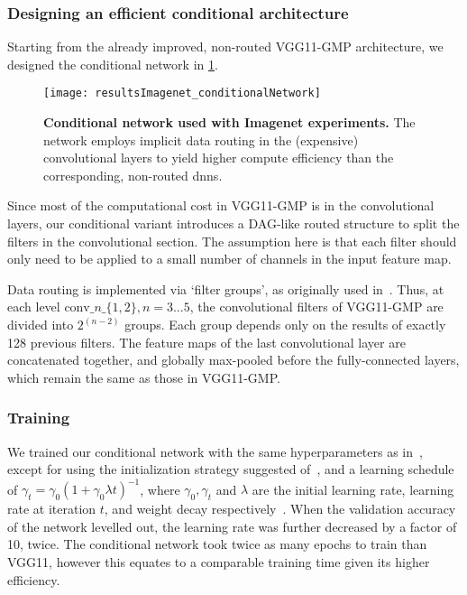\documentclass[thesis]{subfiles}
\begin{document}
	\subsubsection{Designing an efficient conditional architecture}
	Starting from the already improved, non-routed VGG11-GMP architecture, we designed the conditional network in \cref{fig:Imagenet_CondNet}.
	\begin{figure}[tbp]
		\centering
		\texttt{[image: resultsImagenet\_conditionalNetwork]}
		\caption[Conditional network used with Imagenet ILSVRC experiments.]{\textbf{Conditional network used with Imagenet experiments.} The network employs implicit data routing in the (expensive) convolutional layers to yield higher compute efficiency than the corresponding, non-routed \glspl{dnn}.}\label{fig:Imagenet_CondNet}
	\end{figure}
	Since most of the computational cost in VGG11-GMP is in the convolutional layers, our conditional variant 
	introduces a DAG-like routed structure to split the filters in the convolutional section.
	The assumption here is that each filter should only need to be applied to a small number of channels in the input feature map.
	
	Data routing is implemented via `filter groups', as originally used in~\citep{Krizhevsky2012}. 
	Thus, at each level $\textrm{conv}\_n\_\{1,2\}, n=3\ldots 5$, the convolutional filters of VGG11-GMP are 
	divided into $2^{(n-2)}$ groups. Each group depends only on the results of exactly 128 previous filters. 
	The feature maps of the last convolutional layer are concatenated together, and globally max-pooled
	before the fully-connected layers, which remain the same as those in VGG11-GMP.
	
	\subsubsection{Training}
	We trained our conditional network with the same hyperparameters as in~\citep{Simonyan2014verydeep}, 
	except for using the initialization strategy suggested of~\citep{He2015b}, and a learning schedule of 
	$\gamma_t = \gamma_0(1+\gamma_0\lambda t)^{-1}$, where $\gamma_0,\gamma_t$ and $\lambda$ 
	are the initial learning rate, learning rate at iteration $t$, and weight decay respectively~\citep{Bottou2012sgdtricks}. 
	When the validation accuracy of the network levelled out, the learning rate was further decreased by a factor of 10, twice. 
	The conditional network took twice as many epochs to train than VGG11, however this equates to a comparable
	training time given its higher efficiency.
\end{document}
